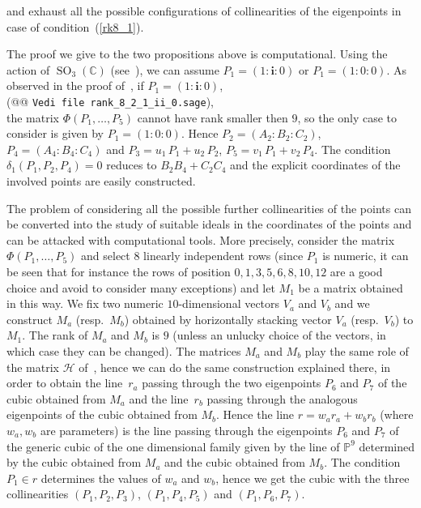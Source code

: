 \documentclass{amsart}
\theoremstyle{plain}
\theoremstyle{definition}
\newcommand{\C}{\mathbb{C}}
\newcommand{\p}{\mathbb{P}}
\newcommand{\SO}{\operatorname{SO}}
\newcommand{\iii}{\textbf{i}}
\begin{document}
 and  exhaust all the possible configurations
of collinearities of the eigenpoints in case of condition~(\ref{rk8_1}).

The proof we give to the two propositions above is computational.
Using the action of $\SO_3(\C)$ (see~),
we can assume $P_1= (1: \iii: 0)$ or $P_1= (1: 0: 0)$. As observed
in the proof of~, if $P_1 = (1: \iii: 0)$,\\
(@@ \verb+Vedi file rank_8_2_1_ii_0.sage+), \\
the matrix
$\Phi(P_1, \dots, P_5)$ cannot have rank smaller then $9$, so the only
case to consider is given by $P_1 = (1: 0: 0)$. Hence
$P_2 = (A_2: B_2: C_2)$, $P_4 = (A_4: B_4: C_4)$ and
$P_3 = u_1 \, P_1 + u_2 \, P_2$, $P_5=v_1 \, P_1 + v_2 \, P_4$.
The condition $\delta_1(P_1, P_2, P_4)=0$ reduces to $B_2B_4+C_2C_4$
and the explicit coordinates of the involved points are easily constructed.

The problem of considering all the possible further
collinearities of the points can be converted into the study of suitable
ideals in the coordinates of the points and can be attacked with
computational tools. More precisely,
consider the matrix $\Phi(P_1, \dots, P_5)$ and select $8$ linearly independent
rows (since $P_1$ is numeric, it can be seen that for instance the rows
of position $0, 1, 3, 5, 6, 8, 10, 12$ are a good choice and avoid to consider
many exceptions) and let $M_1$ be a matrix obtained in this way.
We fix two numeric $10$-dimensional vectors $V_a$ and $V_b$ and we construct
$M_a$ (resp.\ $M_b$) obtained by horizontally stacking vector
$V_a$ (resp.\ $V_b$)
to $M_1$. The rank of $M_a$ and $M_b$ is $9$ (unless an unlucky choice
of the vectors, in which case they can be changed). The matrices $M_a$ and
$M_b$ play the same role of the matrix $\mathcal{H}$
of~, hence we can do the same construction explained
there, in order to obtain the line~$r_a$ passing through the two
eigenpoints $P_6$ and $P_7$ of the cubic obtained from $M_a$ and the
line~$r_b$ passing through the analogous eigenpoints of the cubic
obtained from $M_b$.
Hence the line $r = w_ar_a+w_br_b$
(where $w_a, w_b$ are parameters) is the line passing through the eigenpoints
$P_6$ and $P_7$
of the generic cubic of the one dimensional family given by the line
of $\p^9$ determined by the cubic obtained from $M_a$ and
the cubic obtained from $M_b$. The condition $P_1 \in r$
determines the values of $w_a$ and $w_b$, hence we get the cubic
with the three collinearities $(P_1, P_2, P_3)$,
$(P_1, P_4, P_5)$ and $(P_1, P_6, P_7)$.
%
\end{document}
